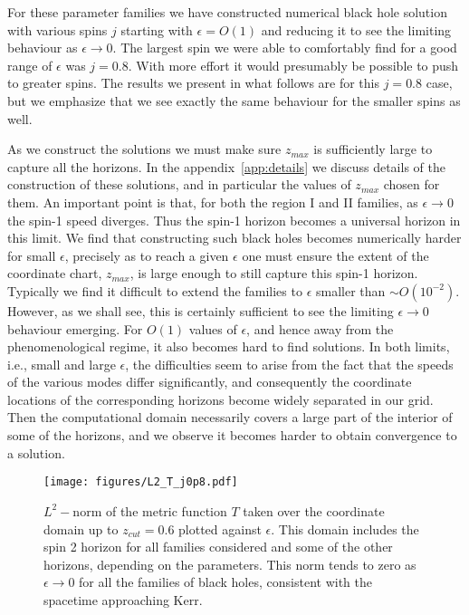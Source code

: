 \documentclass[12pt]{article}
\numberwithin{equation}{section}
\begin{document}
For these parameter families we have constructed numerical black hole solution with various spins $j$ starting with $\epsilon = O(1)$ and reducing it to see the limiting behaviour as $\epsilon \to 0$. The largest spin we were able to comfortably find for a good range of $\epsilon$ was $j = 0.8$. With more effort it would presumably be possible to push to greater spins. The results we present in what follows are for this $j = 0.8$ case, but we emphasize that we see exactly the same behaviour for the smaller spins as well.


As we construct the solutions we must make sure $z_{max}$ is sufficiently large to capture all the horizons. In the appendix~\ref{app:details} we discuss details of the construction of these solutions, and in particular the values of $z_{max}$ chosen for them. 
%
An important point is that, for both the region I and II families, as $\epsilon \to 0$ the spin-1 speed diverges. Thus the spin-1 horizon becomes a universal horizon in this limit. We find that constructing such black holes becomes numerically harder for small $\epsilon$, precisely as to reach a given $\epsilon$ one must ensure the extent of the coordinate chart, $z_{max}$, is large enough to still capture this spin-1 horizon. Typically we find it difficult to extend the families to $\epsilon$ smaller than $\sim O(10^{-2})$. However, as we shall see, this is certainly sufficient to see the limiting $\epsilon \to 0$ behaviour emerging. For $O(1)$ values of $\epsilon$, and hence away from the phenomenological regime, it also becomes hard to find solutions. In both limits, i.e., small and large $\epsilon$, the difficulties seem to arise from the fact that the speeds of the various modes differ significantly, and consequently the coordinate locations of the corresponding horizons become widely separated in our grid. Then the computational domain necessarily covers a large part of the interior of some of the horizons, and we observe it becomes harder to obtain convergence to a solution.

\begin{figure}
\centerline{  
  \texttt{[image: figures/L2\_T\_j0p8.pdf]}
  }
  \caption{\label{fig:MetricLimit}
  $L^2-$norm of the metric function $T$ taken over the coordinate domain up to $z_{cut}=0.6$ plotted against $\epsilon$. This domain includes the spin 2 horizon for all families considered and some of the other horizons, depending on the parameters. This norm tends to zero as $\epsilon\to 0$ for all the families of black holes, consistent with the spacetime approaching Kerr.
  }
\end{figure}
\end{document}
